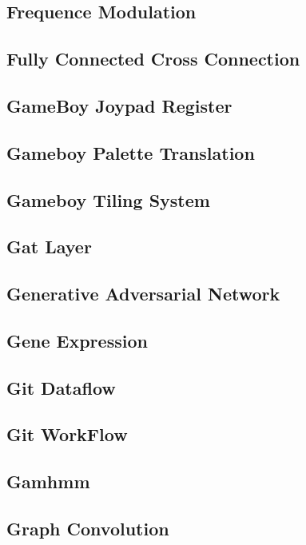 \documentclass{article}
\newcommand{\example}[1]{
\resizebox{\linewidth}{!}{

}

}
\begin{document}
\subsection{Frequence Modulation}
\example{frequency_modulation}
\subsection{Fully Connected Cross Connection}
\example{fully-connected_cross-connection}
\subsection{GameBoy Joypad Register}
\example{gameboy_joypad_register}
\subsection{Gameboy Palette Translation}
\example{gameboy_palette_translation}
\subsection{Gameboy Tiling System}
\example{gameboy_tiling_system}

\subsection{Gat Layer}
\example{gat_layer}
\subsection{Generative Adversarial Network}
\example{generative_adversarial_network}
\subsection{Gene Expression}
\example{gene_expression}
\subsection{Git Dataflow}
\example{git_dataflow}
\subsection{Git WorkFlow}
\example{git_workflow}
\subsection{Gamhmm}
\example{gmhmm}
\subsection{Graph Convolution}
\example{graph_convolution}
\end{document}
